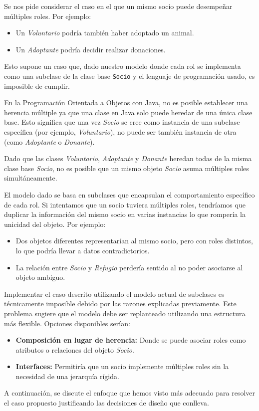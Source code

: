 
Se nos pide considerar el caso en el que un mismo socio puede desempeñar 
múltiples roles. Por ejemplo:
\begin{itemize}
    \item Un \emph{Voluntario} podría también haber adoptado un animal.
    \item Un \emph{Adoptante} podría decidir realizar donaciones.
\end{itemize}

Esto supone un caso que, dado nuestro modelo donde cada
rol se implementa como una subclase de la clase base \texttt{Socio}
y el lenguaje de programación usado, es imposible de cumplir.

En la Programación Orientada a Objetos con Java, no es posible establecer 
una herencia múltiple ya que una clase en Java solo puede heredar de una 
única clase base. Esto significa que una vez \emph{Socio} se cree como 
instancia de una subclase específica (por ejemplo, \emph{Voluntario}), 
no puede ser también instancia de otra (como \emph{Adoptante} o \emph{Donante}).\par
\vspace{0.15cm}
Dado que las clases \emph{Voluntario}, \emph{Adoptante} y \emph{Donante} 
heredan todas de la misma clase base \emph{Socio}, no es posible que un 
mismo objeto \emph{Socio} asuma múltiples roles simultáneamente.\par

El modelo dado se basa en subclases que encapsulan el comportamiento 
específico de cada rol. Si intentamos que un socio tuviera múltiples roles, 
tendríamos que duplicar la información del mismo socio en varias instancias 
lo que rompería la unicidad del objeto. Por ejemplo:
\begin{itemize}
    \item Dos objetos diferentes representarían al mismo socio, pero 
    con roles distintos, lo que podría llevar a datos contradictorios.
    \item La relación entre \emph{Socio} y \emph{Refugio} perdería sentido 
    al no poder asociarse al objeto ambiguo.
\end{itemize}

Implementar el caso descrito utilizando el modelo actual de subclases es 
técnicamente imposible debido por las razones explicadas previamente. 
Este problema sugiere que el modelo debe ser replanteado utilizando una 
estructura más flexible. Opciones disponibles serían:
\begin{itemize}
    \item \textbf{Composición en lugar de herencia:} 
    Donde se puede asociar roles como atributos o relaciones del objeto \emph{Socio}.
    \item \textbf{Interfaces:} 
    Permitiría que un socio implemente múltiples roles sin la necesidad de 
    una jerarquía rígida.
\end{itemize}

A continuación, se discute el enfoque que hemos visto más adecuado para resolver 
el caso propuesto justificando las decisiones de diseño que conlleva.

\newpage